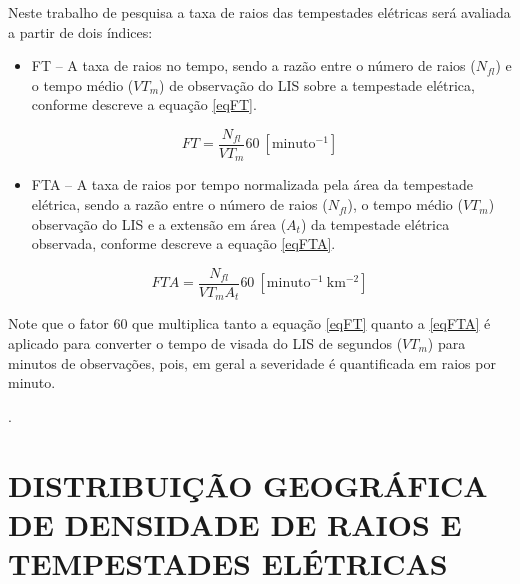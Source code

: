 Neste trabalho de pesquisa a taxa de raios das tempestades elétricas será avaliada a partir de dois índices:

\begin{itemize}
\item FT -- A taxa de raios no tempo, sendo a razão entre o número de raios ($N_{fl}$) e o tempo médio ($VT_m$) de observação do LIS sobre a tempestade elétrica, conforme descreve a equação \ref{eqFT}.
\end{itemize}

\begin{equation}
FT = \frac{N_{fl} }{VT_m} 60 ~[\mathrm{minuto^{-1}}]  
\label{eqFT}  
\end{equation}

\begin{itemize}
\item FTA -- A taxa de raios por tempo normalizada pela área da tempestade elétrica, sendo a razão entre o número de raios ($N_{fl}$), o tempo médio ($VT_m$) observação do LIS e a extensão em área ($A_t$) da tempestade elétrica observada, conforme descreve a equação \ref{eqFTA}.
\end{itemize}

\begin{equation}
FTA = \frac{N_{fl} }{VT_m A_t } 60 ~[\mathrm{minuto^{-1}~km^{-2}}]
\label{eqFTA}
\end{equation}


Note que o fator 60 que multiplica tanto a equação \ref{eqFT} quanto a \ref{eqFTA} é aplicado para converter o tempo de visada do LIS de segundos ($VT_m$) para minutos de observações, pois, em geral a severidade é quantificada em raios por minuto.


 .


\section{DISTRIBUIÇÃO GEOGRÁFICA DE DENSIDADE DE RAIOS E TEMPESTADES ELÉTRICAS}
\label{metodoPass}


